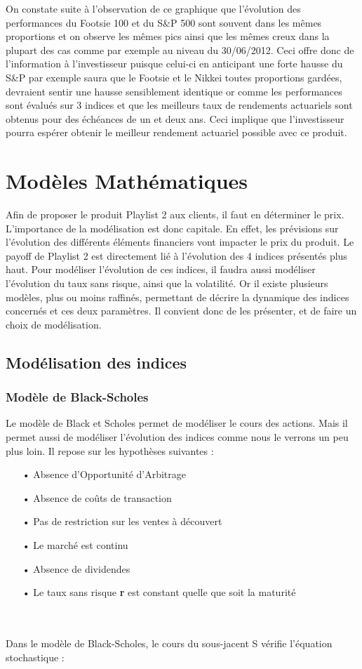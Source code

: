 \documentclass[french,12pt,a4paper]{article}
\begin{document}
On constate suite à l'observation de ce graphique que l'évolution des performances du Footsie 100 et du S\&P 500 sont souvent dans les mêmes proportions et on observe les mêmes pics ainsi que les mêmes creux dans la plupart des cas comme par exemple au niveau du 30/06/2012.
Ceci offre donc de l'information à l'investisseur puisque celui-ci en anticipant une forte hausse du S\&P par exemple saura que le Footsie et le Nikkei toutes proportions gardées, devraient sentir une hausse sensiblement identique or comme les performances sont évalués sur 3 indices et que les meilleurs taux de rendements actuariels sont obtenus pour des échéances de un et deux ans. Ceci implique que l'investisseur pourra espérer obtenir le meilleur rendement actuariel possible avec ce produit.

\newpage



\section{Modèles Mathématiques}
Afin de proposer le produit Playlist 2 aux clients, il faut en déterminer le prix. L'importance de la modélisation est donc capitale. En effet, les prévisions sur l'évolution des différents éléments financiers vont impacter le prix du produit. Le payoff de Playlist 2 est directement lié à l'évolution des 4 indices présentés plus haut. Pour modéliser l'évolution de ces indices, il faudra aussi modéliser l'évolution du taux sans risque, ainsi que la volatilité. Or il existe plusieurs modèles, plus ou moins raffinés, permettant de décrire la dynamique des indices concernés et ces deux paramètres. Il convient donc de les présenter, et de faire un choix de modélisation.

\subsection{Modélisation des indices}

\subsubsection{Modèle de Black-Scholes}
Le modèle de Black et Scholes permet de modéliser le cours des actions. Mais il permet aussi de modéliser l'évolution des indices comme nous le verrons un peu plus loin. Il repose sur les hypothèses suivantes :
\begin{itemize}
\item[•] Absence d'Opportunité d'Arbitrage
\item[•] Absence de coûts de transaction
\item[•] Pas de restriction sur les ventes à découvert
\item[•] Le marché est continu
\item[•] Absence de dividendes
\item[•] Le taux sans risque \textbf{r} est constant quelle que soit la maturité
\end{itemize}
\\ \\
Dans le modèle de Black-Scholes, le cours du sous-jacent S vérifie l'équation stochastique :
\end{document}
